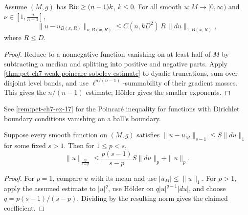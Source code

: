 \begin{theorem}
  \label{thm:pet-ch7-poincare-sobolev}

  Assume $(M,g)$ has $\operatorname{Ric}\ge(n-1)k$, $k\le0$. For all smooth $u:M\to[0,\infty)$
  and $\nu\in[1,\tfrac{n}{n-1}]$,
  \[
    \|u-u_{B(x,R)}\|_{\nu,B(x,R)}\le C(n,kD^2)\,R\,\|du\|_{1,B(x,R)},
  \]
  where $R\le D$.
\end{theorem}
\begin{proof}
  \sketch
  Reduce to a nonnegative function vanishing on at least half of \(M\) by subtracting a median and splitting into positive and negative parts. Apply \cref{thm:pet-ch7-weak-poincare-sobolev-estimate} to dyadic truncations, sum over disjoint level bands, and use \(\ell^{n/(n-1)}\)-summability of their gradient masses. This gives the \(n/(n-1)\) estimate; Hölder gives the smaller exponents.
\end{proof}

\begin{remark}
  \label{rem:pet-ch7-dirichlet-poincare}

  See \cref{rem:pet-ch7-ex-17} for the Poincaré inequality for functions with
  Dirichlet boundary conditions vanishing on a ball's boundary.
\end{remark}

\begin{proposition}
  \label{prop:pet-ch7-sobolev-hierarchy}

  Suppose every smooth function on $(M,g)$ satisfies $\|u-u_M\|_{s-1}\le
  S\|du\|_1$ for some fixed $s>1$. Then for $1\le p<s$,
  \[
    \|u\|_{\frac{sp}{s-p}}\le\frac{p(s-1)}{s-p}S\|du\|_p+\|u\|_p.
  \]
\end{proposition}
\begin{proof}
  \sketch
  For \(p=1\), compare \(u\) with its mean and use \(|u_M|\le\|u\|_1\). For \(p>1\), apply the assumed estimate to \(|u|^q\), use Hölder on \(q|u|^{q-1}|du|\), and choose \(q=p(s-1)/(s-p)\). Dividing by the resulting norm gives the claimed coefficient.
\end{proof}


